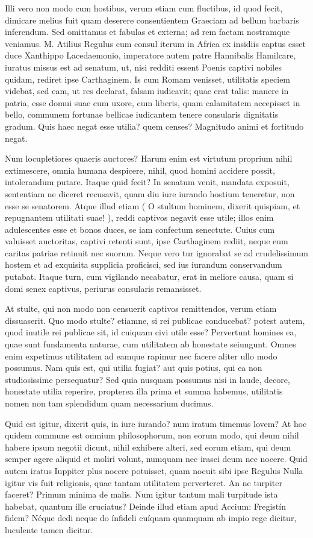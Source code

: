  Illi vero non modo cum hostibus, verum etiam cum fluctibus, id quod fecit, dimicare melius fuit quam deserere consentientem Graeciam ad bellum barbaris inferendum. Sed omittamus et fabulas et externa; ad rem factam nostramque veniamus. M. Atilius Regulus cum consul iterum in Africa ex insidiis captus esset duce Xanthippo Lacedaemonio, imperatore autem patre Hannibalis Hamilcare, iuratus missus est ad senatum, ut, nisi redditi essent Poenis captivi nobiles quidam, rediret ipse Carthaginem. Is cum Romam venisset, utilitatis speciem videbat, sed eam, ut res declarat, falsam iudicavit; quae erat talis: manere in patria, esse domui suae cum uxore, cum liberis, quam calamitatem accepisset in bello, communem fortunae bellicae iudicantem tenere consularis dignitatis gradum. Quis haec negat esse utilia? quem censes? Magnitudo animi et fortitudo negat.

 Num locupletiores quaeris auctores? Harum enim est virtutum proprium nihil extimescere, omnia humana despicere, nihil, quod homini accidere possit, intolerandum putare. Itaque quid fecit? In senatum venit, mandata exposuit, sententiam ne diceret recusavit, quam diu iure iurando hostium teneretur, non esse se senatorem. Atque illud etiam ( O stultum hominem, dixerit quispiam, et repugnantem utilitati suae! ), reddi captivos negavit esse utile; illos enim adulescentes esse et bonos duces, se iam confectum senectute. Cuius cum valuisset auctoritas, captivi retenti sunt, ipse Carthaginem rediit, neque eum caritas patriae retinuit nec suorum. Neque vero tur ignorabat se ad crudelissimum hostem et ad exquisita supplicia proficisci, sed ius iurandum conservandum putabat. Itaque turn, cum vigilando necabatur, erat in meliore causa, quam si domi senex captivus, periurus consularis remansisset.

 At stulte, qui non modo non censuerit captivos remittendos, verum etiam dissuaserit. Quo modo stulte? etiamne, si rei publicae conducebat? potest autem, quod inutile rei publicae sit, id cuiquam civi utile esse? Pervertunt homines ea, quae sunt fundamenta naturae, cum utilitatem ab honestate seiungunt. Omnes enim expetimus utilitatem ad eamque rapimur nec facere aliter ullo modo possumus. Nam quis est, qui utilia fugiat? aut quis potius, qui ea non studiosissime persequatur? Sed quia nusquam possumus nisi in laude, decore, honestate utilia reperire, propterea illa prima et summa habemus, utilitatis nomen non tam splendidum quam necessarium ducimus.

 Quid est igitur, dixerit quis, in iure iurando? num iratum timemus lovem? At hoc quidem commune est omnium philosophorum, non eorum modo, qui deum nihil habere ipsum negotii dicunt, nihil exhibere alteri, sed eorum etiam, qui deum semper agere aliquid et moliri volunt, numquam nec irasci deum nec nocere. Quid autem iratus Iuppiter plus nocere potuisset, quam nocuit sibi ipse Regulus Nulla igitur vis fuit religionis, quae tantam utilitatem perverteret. An ne turpiter faceret? Primum minima de malis. Num igitur tantum mali turpitude ista habebat, quantum ille cruciatus? Deinde illud etiam apud Accium: Fregistín fidem? Néque dedi neque do ínfideli cuíquam quamquam ab impio rege dicitur, luculente tamen dicitur.

